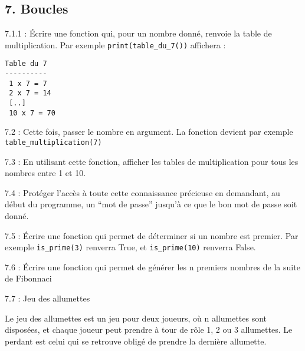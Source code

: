 \documentclass[]{article}
\begin{document}
\hypertarget{boucles}{%
\subsection{7. Boucles}\label{boucles}}

7.1.1 : Écrire une fonction qui, pour un nombre donné, renvoie la table
de multiplication. Par exemple \texttt{print(table\_du\_7())} affichera
:

\begin{verbatim}
Table du 7
----------
 1 x 7 = 7
 2 x 7 = 14
 [..]
 10 x 7 = 70
\end{verbatim}

7.2 : Cette fois, passer le nombre en argument. La fonction devient par
exemple \texttt{table\_multiplication(7)}

7.3 : En utilisant cette fonction, afficher les tables de multiplication
pour tous les nombres entre 1 et 10.

7.4 : Protéger l'accès à toute cette connaissance précieuse en
demandant, au début du programme, un ``mot de passe'' jusqu'à ce que le
bon mot de passe soit donné.

7.5 : Écrire une fonction qui permet de déterminer si un nombre est
premier. Par exemple \texttt{is\_prime(3)} renverra True, et
\texttt{is\_prime(10)} renverra False.

7.6 : Écrire une fonction qui permet de générer les n premiers nombres
de la suite de Fibonnaci

7.7 : Jeu des allumettes

Le jeu des allumettes est un jeu pour deux joueurs, où n allumettes sont
disposées, et chaque joueur peut prendre à tour de rôle 1, 2 ou 3
allumettes. Le perdant est celui qui se retrouve obligé de prendre la
dernière allumette.
\end{document}

